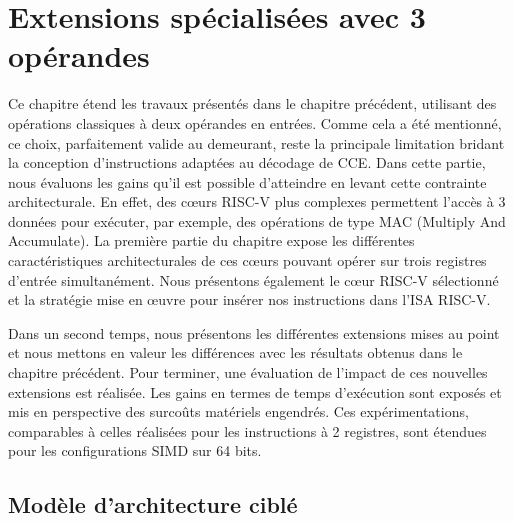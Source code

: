 \documentclass[../main.tex]{subfiles}
\begin{document}

\chapter{Extensions spécialisées avec 3 opérandes} 
\label{chapter:4}

%
%
%
%
%
%
%
%
Ce chapitre étend les travaux présentés dans le chapitre précédent, utilisant  des opérations classiques à deux opérandes en entrées. 
Comme cela a été mentionné, ce choix, parfaitement valide au demeurant, reste la principale limitation bridant la conception d'instructions adaptées au décodage de CCE. 
Dans cette partie, nous évaluons les gains qu'il est possible d'atteindre en levant cette contrainte architecturale.
En effet, des cœurs RISC-V plus complexes permettent l'accès à 3 données pour exécuter, par exemple, des opérations de type MAC (Multiply And Accumulate). 
La première partie du chapitre expose les différentes caractéristiques architecturales de ces cœurs pouvant opérer sur trois registres d'entrée simultanément. 
Nous présentons également le cœur RISC-V sélectionné et la stratégie mise en œuvre pour insérer nos instructions dans l'ISA RISC-V.

Dans un second temps, nous présentons les différentes extensions mises au point et nous mettons en valeur les différences avec les résultats obtenus dans le chapitre précédent.
Pour terminer, une évaluation de l'impact de ces nouvelles extensions est réalisée. 
Les gains en termes de temps d'exécution sont exposés et mis en perspective des surcoûts matériels engendrés.
Ces expérimentations, comparables à celles réalisées pour les instructions à 2 registres, sont étendues pour les configurations SIMD sur 64 bits.


%
%
%
%
%
%
%
%
\localtableofcontents
%
%
%
%
%
%
%
%
\section{Modèle d'architecture ciblé}
%
%
%
%
%
\end{document}
